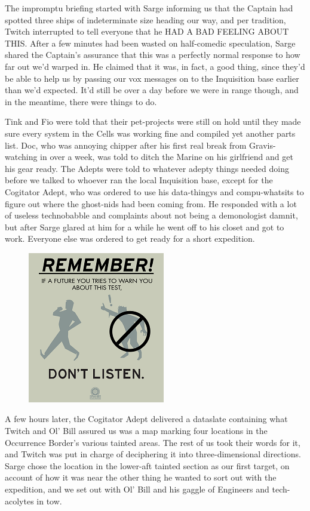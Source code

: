 The impromptu briefing started with Sarge informing us that the Captain had spotted three ships of indeterminate size heading our way, and per tradition, Twitch interrupted to tell everyone that he HAD A BAD FEELING ABOUT THIS. 
After a few minutes had been wasted on half-comedic speculation, Sarge shared the Captain's assurance that this was a perfectly normal response to how far out we'd warped in. 
He claimed that it was, in fact, a good thing, since they'd be able to help us by passing our vox messages on to the Inquisition base earlier than we'd expected. 
It'd still be over a day before we were in range though, and in the meantime, there were things to do.

Tink and Fio were told that their pet-projects were still on hold until they made sure every system in the Cells was working fine and compiled yet another parts list. 
Doc, who was annoying chipper after his first real break from Gravis-watching in over a week, was told to ditch the Marine on his girlfriend and get his gear ready. 
The Adepts were told to whatever adepty things needed doing before we talked to whoever ran the local Inquisition base, except for the Cogitator Adept, who was ordered to use his data-thingys and compu-whatsits to figure out where the ghost-nids had been coming from. 
He responded with a lot of useless technobabble and complaints about not being a demonologist damnit, but after Sarge glared at him for a while he went off to his closet and got to work. 
Everyone else was ordered to get ready for a short expedition.

\begin{figure}
	\begin{center}
		\includegraphics[width=\figwidth]{pics/15/22.png}
	\end{center}
\end{figure}
A few hours later, the Cogitator Adept delivered a dataslate containing what Twitch and Ol' Bill assured us was a map marking four locations in the Occurrence Border's various tainted areas. 
The rest of us took their words for it, and Twitch was put in charge of deciphering it into three-dimensional directions. 
Sarge chose the location in the lower-aft tainted section as our first target, on account of how it was near the other thing he wanted to sort out with the expedition, and we set out with Ol' Bill and his gaggle of Engineers and tech-acolytes in tow.

